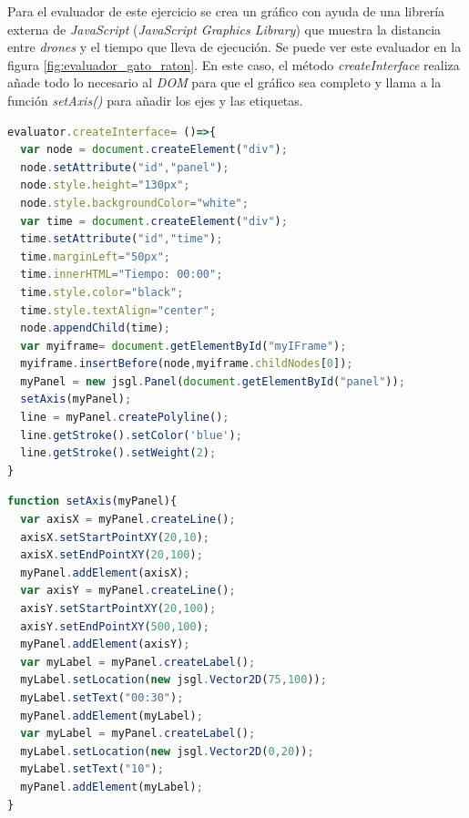   
Para el evaluador de este ejercicio se crea un gráfico con ayuda de una librería externa de \textit{JavaScript} (\textit{JavaScript Graphics Library}\cite{bib:jsgrafico}) que muestra la distancia entre \textit{drones} y el tiempo que lleva de ejecución. Se puede ver este evaluador en la figura \ref{fig:evaluador_gato_raton}. 
 En este caso, el método \textit{createInterface} realiza añade todo lo necesario al \textit{DOM} para que el gráfico sea completo y llama a la función \textit{setAxis()} para añadir los ejes y las etiquetas.
 \begin{lstlisting}[language=javascript,caption=Función que establece los ejes y etiquetas de la gráfica]
 evaluator.createInterface= ()=>{
  var node = document.createElement("div");
  node.setAttribute("id","panel");
  node.style.height="130px";
  node.style.backgroundColor="white";
  var time = document.createElement("div");
  time.setAttribute("id","time");
  time.marginLeft="50px";
  time.innerHTML="Tiempo: 00:00";
  time.style.color="black";
  time.style.textAlign="center";
  node.appendChild(time);
  var myiframe= document.getElementById("myIFrame");
  myiframe.insertBefore(node,myiframe.childNodes[0]);
  myPanel = new jsgl.Panel(document.getElementById("panel"));
  setAxis(myPanel);
  line = myPanel.createPolyline();
  line.getStroke().setColor('blue');
  line.getStroke().setWeight(2);
}
\end{lstlisting}

\begin{lstlisting}[language=javascript,caption=Método \textit{createInterface}]
function setAxis(myPanel){
  var axisX = myPanel.createLine();
  axisX.setStartPointXY(20,10);
  axisX.setEndPointXY(20,100);
  myPanel.addElement(axisX);
  var axisY = myPanel.createLine();
  axisY.setStartPointXY(20,100);
  axisY.setEndPointXY(500,100);
  myPanel.addElement(axisY);
  var myLabel = myPanel.createLabel();
  myLabel.setLocation(new jsgl.Vector2D(75,100));
  myLabel.setText("00:30");
  myPanel.addElement(myLabel);
  var myLabel = myPanel.createLabel();
  myLabel.setLocation(new jsgl.Vector2D(0,20));
  myLabel.setText("10");
  myPanel.addElement(myLabel);
}
\end{lstlisting}

